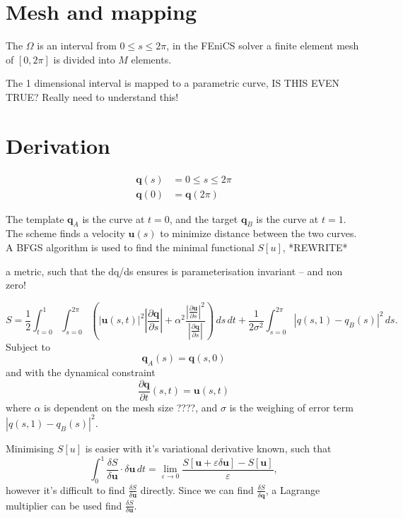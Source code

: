 \documentclass[a4paper, 12pt]{article}
\newcommand{\vect}[1]{\ensuremath{\mathbf{#1}}}
\newcommand{\vv}[2]{\frac{\delta #1}{\delta #2}}
\newcommand{\eps}{\varepsilon}
\begin{document}
\section{Mesh and mapping}
The $\Omega$ is an interval from $0 \leq s \leq 2\pi$, in the FEniCS solver a finite element mesh of $[0,2\pi]$ is divided into $M$ elements.

The 1 dimensional interval is mapped to a parametric curve, IS THIS EVEN TRUE? Really need to understand this!



\section{Derivation}
\begin{align*}
  \vect q(s) &= 0 \leq s \leq 2\pi \\
  \vect q(0) &= \vect q(2\pi)
\end{align*}


The template $\vect q_A$ is the curve at $t=0$, and the target $\vect q_B$
is the curve at $t=1$. The scheme finds a velocity $\vect u(s)$ to minimize
distance between the two curves. A BFGS algorithm is used to find the minimal
functional $S[u]$, *REWRITE*

a metric, such that the dq/ds ensures is parameterisation invariant -- and non zero!

\begin{equation}
  \label{eq:S}
  S = \frac{1}{2} \int^{1}_{t=0} \int^{2\pi}_{s=0}\left( \left| \vect u(s,t) \right|^2 
  \left| \frac{\partial \vect q}{\partial s} \right|  + 
  \alpha^2 \frac{ 
    \left| \frac{\partial \vect u}{\partial s}\right|^2}{
    \left| \frac{\partial \vect q}{\partial s}\right|}\right)  \,ds\,dt
  + \frac{1}{2\sigma^2}\int^{2\pi}_{s=0}\left| q(s,1) - q_B(s)\right|^2\,ds.
\end{equation}
Subject to
\begin{equation}
  \vect q_A(s) =\vect q(s,0)   \label{eq:template}
\end{equation}
and with the dynamical constraint
\begin{equation}
  \frac{\partial \vect q}{\partial t}(s,t) = \vect u(s,t)  \label{eq:dqdt}
\end{equation}
where $\alpha$ is dependent on the mesh size ????, and $\sigma$ is the weighing
of error term $\left| q(s,1) - q_B(s)\right|^2$.

Minimising $S[u]$ is easier with it's variational derivative known, such that
\begin{equation}
  \label{eq:lim_dS}
  \int^1_0 \vv{S}{\vect u}\cdot \delta \vect u\,dt = 
  \lim_{\eps \rightarrow 0} \frac{S[\vect u + \eps \delta \vect u] - S[\vect u]}{\eps},
\end{equation}
 however it's difficult to find $\vv{S}{\vect u}$ directly. Since we can find $\vv{S}{\vect q}$, a Lagrange multiplier can be used find $\vv{S}{\vect u}$.
\end{document}
